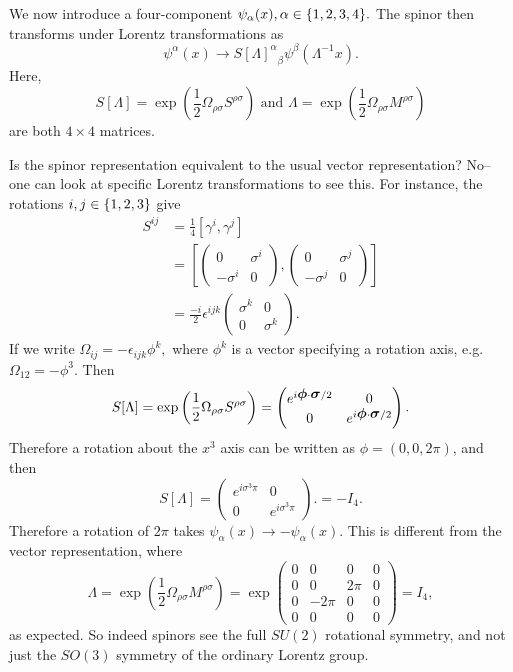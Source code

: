 We now introduce a four-component  $\psi_\alpha(x),\alpha\in\{1,2,3,4\}.$ The spinor then transforms under Lorentz transformations as
$$\psi^\alpha(x) \to {S[\Lambda]^\alpha}_\beta \psi^\beta(\Lambda^{-1}x).$$
Here,
$$S[\Lambda]=\exp \left(\frac{1}{2}\Omega_{\rho\sigma}S^{\rho\sigma}\right)\text{ and }\Lambda=\exp\left(\frac{1}{2}\Omega_{\rho\sigma} M^{\rho\sigma}\right)$$
are both $4\times 4$ matrices.

Is the spinor representation equivalent to the usual vector representation? No-- one can look at specific Lorentz transformations to see this. For instance, the rotations $i,j\in\{1,2,3\}$ give
\begin{align*}
    S^{ij}&= \frac{1}{4}\left[\gamma^i,\gamma^j\right]\\
    &=\left[\begin{pmatrix}
        0&\sigma^i\\
        -\sigma^i&0
    \end{pmatrix},
    \begin{pmatrix}
        0&\sigma^j\\
        -\sigma^j&0
    \end{pmatrix}\right]\\
    &=\frac{-i}{2} \epsilon^{ijk}\begin{pmatrix}
        \sigma^k&0\\
        0&\sigma^k
    \end{pmatrix}.
\end{align*}
If we write $\Omega_{ij}=-\epsilon_{ijk}\phi^k,$ where $\phi^k$ is a vector specifying a rotation axis, e.g. $\Omega_{12}=-\phi^3$.
Then
$$S[\Lambda]=\exp\left(\frac{1}{2}\Omega_{\rho\sigma}S^{\rho\sigma}\right)=\begin{pmatrix}
e^{i\mbox{\boldmath$ \phi $} \cdot \mbox{\boldmath$ \sigma $}/2}& 0\\
0&e^{i\mbox{\boldmath$ \phi $} \cdot \mbox{\boldmath$ \sigma $}/2}
\end{pmatrix}.$$
Therefore a rotation about the $x^3$ axis can be written as $\phi=(0,0,2\pi)$, and then 
$$S[\Lambda]=\begin{pmatrix}
e^{i \sigma^3 \pi}& 0\\
0&e^{i\sigma^3 \pi}
\end{pmatrix}.=-I_4.$$
Therefore a rotation of $2\pi$ takes $\psi_\alpha(x)\to -\psi_\alpha(x).$ This is different from the vector representation, where 
$$\Lambda=\exp\left(\frac{1}{2}\Omega_{\rho\sigma}M^{\rho\sigma}\right)=\exp \begin{pmatrix}
0&0&0&0\\0&0&2\pi&0\\
0&-2\pi&0&0\\
0&0&0&0
\end{pmatrix}=I_4,$$
as expected. So indeed spinors see the full $SU(2)$ rotational symmetry, and not just the $SO(3)$ symmetry of the ordinary Lorentz group.

